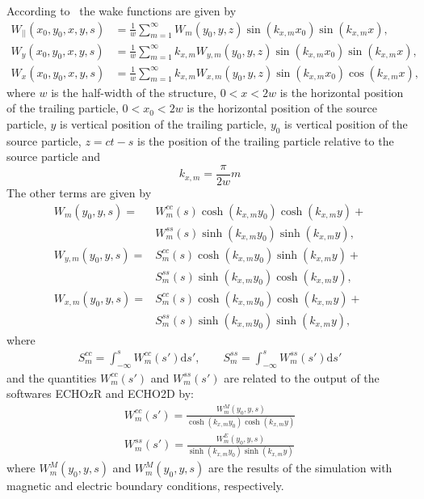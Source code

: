 \begin{apendicesenv}
    According to~ the wake functions are given by
    \begin{align}
		W_{||}(x_0,y_0,x,y,s) &=
            \frac1w\sum_{m=1}^\infty W_m(y_0,y,z)\sin(k_{x,m}x_0)\sin(k_{x,m}x), \\[4mm]
		W_y(x_0,y_0,x,y,s) &=
            \frac1w\sum_{m=1}^\infty k_{x,m}W_{y,m}(y_0,y,z)\sin(k_{x,m}x_0)\sin(k_{x,m}x), \\[4mm]
		W_x(x_0,y_0,x,y,s) &=
            \frac1w\sum_{m=1}^\infty k_{x,m}W_{x,m}(y_0,y,z)\sin(k_{x,m}x_0)\cos(k_{x,m}x),
    \end{align}
    where $w$ is the half-width of the structure, $0<x<2w$ is the horizontal position of the trailing particle, $0<x_0<2w$ is the horizontal position of the source particle, $y$ is vertical position of the trailing particle, $y_0$ is vertical position of the source particle, $z=ct-s$ is the position of the trailing particle relative to the source particle and
    \begin{equation}
    k_{x,m} = \frac{\pi}{2w}m
    \end{equation}
    The other terms are given by
    \begin{align}
		W_m(y_0,y,s)     = &W^{cc}_m(s)\cosh(k_{x,m}y_0)\cosh(k_{x,m}y) +\\\nonumber
                           &W^{ss}_m(s)\sinh(k_{x,m}y_0)\sinh(k_{x,m}y), \\[4mm]
		W_{y,m}(y_0,y,s) = &S^{cc}_m(s)\cosh(k_{x,m}y_0)\sinh(k_{x,m}y) +\\\nonumber
                           &S^{ss}_m(s)\sinh(k_{x,m}y_0)\cosh(k_{x,m}y), \\[4mm]
		W_{x,m}(y_0,y,s) = &S^{cc}_m(s)\cosh(k_{x,m}y_0)\cosh(k_{x,m}y) +\\\nonumber
                           &S^{ss}_m(s)\sinh(k_{x,m}y_0)\sinh(k_{x,m}y),
    \end{align}
    where
    \begin{align}
		S^{cc}_m = \int_{-\infty}^s W^{cc}_m(s')\mathrm{d}s', \qquad S^{ss}_m = \int_{-\infty}^s W^{ss}_m(s')\mathrm{d}s'
    \end{align}
    and the quantities $W^{cc}_m(s')$ and $W^{ss}_m(s')$ are related to the output of the softwares ECHOzR and ECHO2D by:
    \begin{align}
		W^{cc}_m(s') = \frac{W_m^M(y_0,y,s)}{\cosh(k_{x,m}y_0)\cosh(k_{x,m}y)} \\[4mm]
		W^{ss}_m(s') = \frac{W_m^E(y_0,y,s)}{\sinh(k_{x,m}y_0)\sinh(k_{x,m}y)}
    \end{align}
    where $W_m^M(y_0,y,s)$ and $W_m^M(y_0,y,s)$ are the results of the simulation with magnetic and electric boundary conditions, respectively.



\end{apendicesenv}
